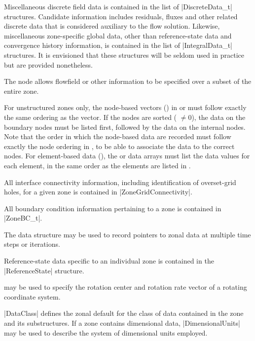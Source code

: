 Miscellaneous discrete field data is contained in the list of
|DiscreteData_t| structures.
Candidate information includes residuals, fluxes and other related
discrete data that is considered auxiliary to the flow solution.
Likewise, miscellaneous zone-specific global data, other than
reference-state data and convergence history information, is contained
in the list of |IntegralData_t| structures.
It is envisioned that these structures will be seldom used in practice
but are provided nonetheless.

The  node allows flowfield or other information
to be specified over a subset of the entire zone. 

For unstructured zones only, the node-based 
vectors () in  or
 must follow exactly the same ordering as the
 vector.
If the nodes are sorted ( $\neq 0$), the data
on the boundary nodes must be listed first, followed by the data on the
internal nodes.
Note that the order in which the node-based data are recorded must
follow exactly the node ordering in , to be
able to associate the data to the correct nodes.
For element-based data (), the
 or  data arrays must list
the data values for each element, in the same order as the elements are
listed in .

All interface connectivity information, including identification
of overset-grid holes, for a given zone is contained in
|ZoneGridConnectivity|.

All boundary condition information pertaining to a zone is contained in 
|ZoneBC_t|.

The  data structure may be used to record
pointers to zonal data at multiple time steps or iterations.

Reference-state data specific to an individual zone is contained in the
|ReferenceState| structure.  

 may be used to specify the rotation center
and rotation rate vector of a rotating coordinate system.

|DataClass| defines the zonal default for the class of data contained in
the zone and its substructures.  If a zone contains dimensional data,
|DimensionalUnits| may be used to describe the system of
dimensional units employed.

